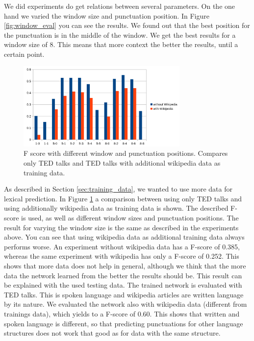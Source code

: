We did experiments do get relations between several parameters.
On the one hand we varied the window size and punctuation position.
In Figure \ref{fig:window_eval} you can see the results.
We found out that the best position for the punctuation is in the middle of the window.
We get the best results for a window size of 8.
This means that more context the better the results, until a certain point.

\begin{figure}[ht]
    \centering
    \includegraphics[width=0.75\textwidth]{img/window_wiki_eval.png}
    \caption{F score with different window and punctuation positions. Compares only TED talks and TED talks with additional wikipedia data as training data.}
    \label{fig:window_wiki_eval}
\end{figure}

As described in Section \ref{sec:training_data}, we wanted to use more data for lexical prediction.
In Figure \ref{fig:window_wiki_eval} a comparison between using only TED talks and using additionally wikipedia data as training data is shown.
The described F-score is used, as well as different window sizes and punctuation positions.
The result for varying the window size is the same as described in the experiments above.
You can see that using wikipedia data as additional training data always performs worse.
An experiment without wikipedia data has a F-score of 0.385, whereas the same experiment with wikipedia has only a F-score of 0.252.
This shows that more data does not help in general, although we think that the more data the network learned from the better the results should be.
This result can be explained with the used testing data.
The trained network is evaluated with TED talks.
This is spoken language and wikipedia articles are written language by its nature.
We evaluated the network also with wikipedia data (different from trainings data), which yields to a F-score of 0.60.
This shows that written and spoken language is different, so that predicting punctuations for other language structures does not work that good as for data with the same structure.

